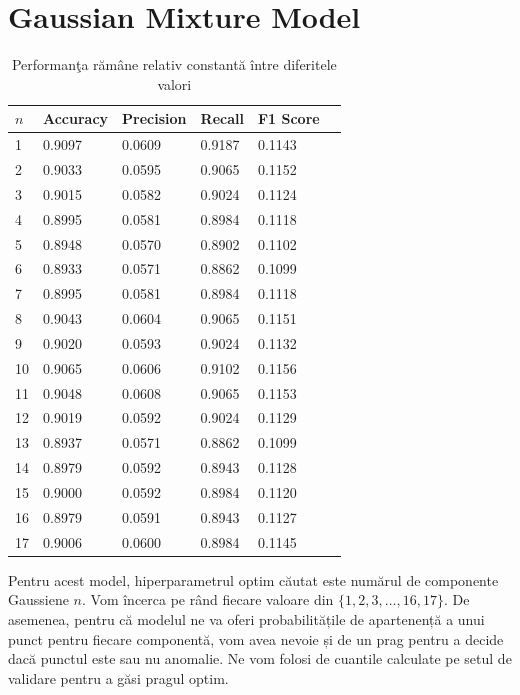 \noindent

\section{Gaussian Mixture Model}

\begin{table}[H]
  \centering
  \begin{tabularx}{\textwidth}{
      |X
      |X
      |X
      |X
      |X
      |X|
  }
  \hline
  $n$ & {Accuracy} & {Precision} & {Recall} & {F1 Score} \\
  \hline
  \rowcolor{gray!20} 1 & 0.9097 & 0.0609 & 0.9187 & 0.1143 \\
  2 & 0.9033 & 0.0595 & 0.9065 & 0.1152 \\
  \rowcolor{gray!20} 3 & 0.9015 & 0.0582 & 0.9024 & 0.1124 \\
  4 & 0.8995 & 0.0581 & 0.8984 & 0.1118 \\
  \rowcolor{gray!20} 5 & 0.8948 & 0.0570 & 0.8902 & 0.1102 \\
  6 & 0.8933 & 0.0571 & 0.8862 & 0.1099 \\
  \rowcolor{gray!20} 7 & 0.8995 & 0.0581 & 0.8984 & 0.1118 \\
  8 & 0.9043 & 0.0604 & 0.9065 & 0.1151 \\
  \rowcolor{gray!20} 9 & 0.9020 & 0.0593 & 0.9024 & 0.1132 \\
  10 & 0.9065 & 0.0606 & 0.9102 & 0.1156 \\
  \rowcolor{gray!20} 11 & 0.9048 & 0.0608 & 0.9065 & 0.1153 \\
  12 & 0.9019 & 0.0592 & 0.9024 & 0.1129 \\
  \rowcolor{gray!20} 13 & 0.8937 & 0.0571 & 0.8862 & 0.1099 \\
  14 & 0.8979 & 0.0592 & 0.8943 & 0.1128 \\
  \rowcolor{gray!20} 15 & 0.9000 & 0.0592 & 0.8984 & 0.1120 \\
  16 & 0.8979 & 0.0591 & 0.8943 & 0.1127 \\
  \rowcolor{gray!20} 17 & 0.9006 & 0.0600 & 0.8984 & 0.1145 \\
  \hline
  \end{tabularx}
  \caption{Performanţa rămâne relativ constantă între diferitele valori}
\end{table}



Pentru acest model, hiperparametrul optim 
căutat este numărul de componente Gaussiene $n$. Vom încerca pe rând fiecare valoare
din $\{1, 2, 3, \ldots, 16, 17\}$. De asemenea, pentru că modelul 
ne va oferi probabilitățile de apartenență a unui punct pentru 
fiecare componentă, vom avea nevoie și de un prag pentru a decide 
dacă punctul este sau nu anomalie. Ne vom folosi de cuantile 
calculate pe setul de validare pentru a găsi pragul optim.


